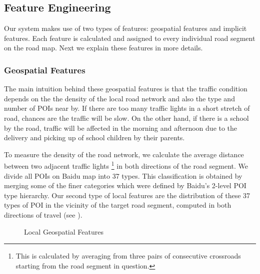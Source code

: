 \subsection{Feature Engineering}
\label{sec:feature}
Our system makes use of two types of features: geospatial
features and implicit features.
Each feature is calculated and assigned to every individual road segment
on the road map. Next we explain these features in more details.

\subsubsection{Geospatial Features}
The main intuition behind these geospatial features is that the traffic 
condition depends on the the density of the local road network and also
the type and number of POIs near by. If there are too many traffic lights in a short stretch
of road, chances are the traffic will be slow. On the other hand, if there is a
school by the road, traffic will be affected in the morning and afternoon due to
the delivery and picking up of school children by their parents. 

To measure the density of the road network, 
we calculate the average distance between two adjacent traffic lights \footnote{This is calculated by averaging from three pairs of consecutive crossroads
starting from the road segment in question.} in
both directions of the road segment.
We divide all POIs on Baidu map into 37 types.
This classification is obtained by merging some of the finer categories which
were defined by Baidu's 2-level POI type hierarchy. Our second type of local 
features are the distribution of these 37 types of POI in the vicinity of the
target road segment, computed in both directions of travel 
(see ). 

\begin{figure}[th]
	\centering
	\caption{Local Geospatial Features}
	\label{fig:poifeature}
\end{figure}



